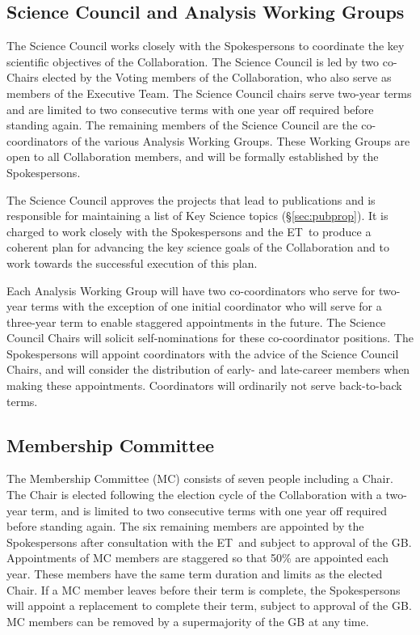 \documentclass[12pt]{article}
\newcommand{\exec}{{Executive Team}}
\newcommand{\shorte}{{ET}}  %
\begin{document}
\subsection{Science Council and Analysis Working Groups}
\label{sec:SC}

The Science Council works closely with the Spokespersons to coordinate the key scientific objectives of the Collaboration.  The Science Council is led by two co-Chairs elected by the Voting members of the Collaboration, who also serve as members of the \exec. The Science Council chairs serve two-year terms and are limited to two consecutive terms with one year off required before standing again.
The remaining members of the Science Council are the co-coordinators of the various Analysis Working Groups. These Working Groups are open to all Collaboration members, and will be formally established by the Spokespersons.  

The Science Council approves the projects that lead to publications and is responsible for maintaining a list of Key Science topics  (\S\ref{sec:pubprop}). It is charged to work closely with the Spokespersons and the \shorte\ to produce a coherent plan for advancing the key science goals of the Collaboration and to work towards the successful execution of this plan.

Each Analysis Working Group will have two co-coordinators who  serve for two-year terms with the exception of one initial coordinator who will serve for a three-year term to enable staggered appointments in the future.  The Science Council Chairs will solicit self-nominations for these co-coordinator positions. The Spokespersons will appoint coordinators with the advice of the Science Council Chairs, and will consider the distribution of early- and late-career members when making these appointments. Coordinators will ordinarily not serve back-to-back terms.\\


\subsection{Membership Committee}

The Membership Committee (MC) consists of seven people including a Chair. The Chair is elected following the election cycle of the Collaboration with a  two-year term, and is limited to two consecutive terms with one year off required before standing again. The six remaining members are appointed by the Spokespersons after consultation with the \shorte\ and subject to approval of the GB. Appointments of MC members are staggered so that 50\% are appointed each year. These members have the same term duration and limits as the elected Chair. If a MC member leaves before their term is complete, the Spokespersons will appoint a replacement to complete their term, subject to approval of the GB.   MC members can be removed by a supermajority of the GB at any time.  
\end{document}
